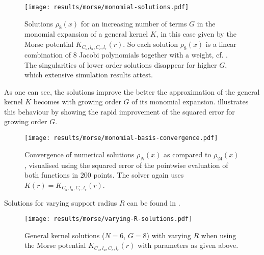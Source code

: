 \begin{figure}[H]
  \centering
  \texttt{[image: results/morse/monomial-solutions.pdf]}
  \caption[General kernel solutions with varying $G$]{Solutions $\rho_8(x)$ for an increasing number of terms $G$ in the monomial expansion of a general kernel $K$, in this case given by the Morse potential $K_{C_a, l_a, C_r, l_r}(r)$. So each solution $\rho_8(x)$ is a linear combination of $8$ Jacobi polynomials together with a weight, cf. . The singularities of lower order solutions disappear for higher $G$, which extensive simulation results attest.}
  \label{fig:monomial-solutions}
\end{figure}

As one can see, the solutions improve the better the approximation of the general kernel $K$ becomes with growing order $G$ of its monomial expansion.
 illustrates this behaviour by showing the rapid improvement of the squared error for growing order $G$.

\begin{figure}[H]
  \centering
  \texttt{[image: results/morse/monomial-basis-convergence.pdf]}
  \caption[Step-by-step convergence when increasing the degree of the monomials]{
    Convergence of numerical solutions $\rho_N(x)$ as compared to $\rho_{24}(x)$, visualised using the squared error of the pointwise evaluation of both functions in $200$ points.
    The solver again uses $K(r) = K_{C_a, l_a, C_r, l_r}(r)$.
  }
  \label{fig:monomial-basis-convergence}
\end{figure}

Solutions for varying support radius $R$ can be found in .

\begin{figure}[H]
  \centering
  \texttt{[image: results/morse/varying-R-solutions.pdf]}
  \caption[Solutions with varying $R$]{General kernel solutions ($N = 6$, $G = 8$) with varying $R$ when using the Morse potential $K_{C_a, l_a, C_r, l_r}(r)$ with parameters as given above.}
  \label{fig:varying-R-solutions}
\end{figure}
